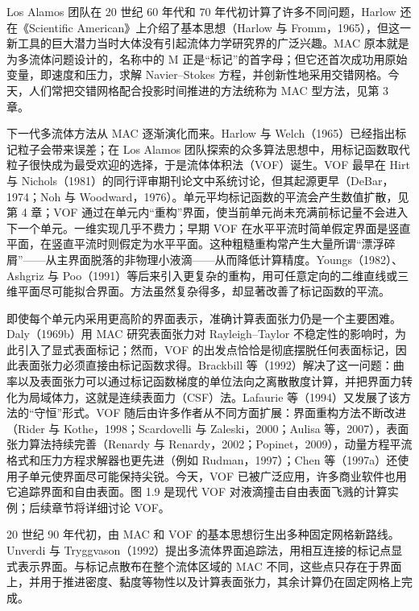 \documentclass[11pt,a4paper,openany,fontset=none]{ctexbook}
\newenvironment{sourceblock}
  {\par\addvspace{0.65\baselineskip}\noindent\begin{minipage}{\linewidth}\centering}
  {\end{minipage}\par\addvspace{0.48\baselineskip}}
\begin{document}
Los Alamos 团队在 20 世纪 60 年代和 70 年代初计算了许多不同问题，Harlow 还在《Scientific American》上介绍了基本思想（Harlow 与 Fromm，1965），但这一新工具的巨大潜力当时大体没有引起流体力学研究界的广泛兴趣。MAC 原本就是为多流体问题设计的，名称中的 M 正是“标记”的首字母；但它还首次成功用原始变量，即速度和压力，求解 Navier--Stokes 方程，并创新性地采用交错网格。今天，人们常把交错网格配合投影时间推进的方法统称为 MAC 型方法，见第 3 章。

下一代多流体方法从 MAC 逐渐演化而来。Harlow 与 Welch（1965）已经指出标记粒子会带来误差；在 Los Alamos 团队探索的众多算法思想中，用标记函数取代粒子很快成为最受欢迎的选择，于是流体体积法（VOF）诞生。VOF 最早在 Hirt 与 Nichols（1981）的同行评审期刊论文中系统讨论，但其起源更早（DeBar，1974；Noh 与 Woodward，1976）。单元平均标记函数的平流会产生数值扩散，见第 4 章；VOF 通过在单元内“重构”界面，使当前单元尚未充满前标记量不会进入下一个单元。一维实现几乎不费力；早期 VOF 在水平平流时简单假定界面是竖直平面，在竖直平流时则假定为水平平面。这种粗糙重构常产生大量所谓“漂浮碎屑”——从主界面脱落的非物理小液滴——从而降低计算精度。Youngs（1982）、Ashgriz 与 Poo（1991）等后来引入更复杂的重构，用可任意定向的二维直线或三维平面尽可能拟合界面。方法虽然复杂得多，却显著改善了标记函数的平流。

即使每个单元内采用更高阶的界面表示，准确计算表面张力仍是一个主要困难。Daly（1969b）用 MAC 研究表面张力对 Rayleigh--Taylor 不稳定性的影响时，为此引入了显式表面标记；然而，VOF 的出发点恰恰是彻底摆脱任何表面标记，因此表面张力必须直接由标记函数求得。Brackbill 等（1992）解决了这一问题：曲率以及表面张力可以通过标记函数梯度的单位法向之离散散度计算，并把界面力转化为局域体力，这就是连续表面力（CSF）法。Lafaurie 等（1994）又发展了该方法的“守恒”形式。VOF 随后由许多作者从不同方面扩展：界面重构方法不断改进（Rider 与 Kothe，1998；Scardovelli 与 Zaleski，2000；Aulisa 等，2007），表面张力算法持续完善（Renardy 与 Renardy，2002；Popinet，2009），动量方程平流格式和压力方程求解器也更先进（例如 Rudman，1997）；Chen 等（1997a）还使用子单元使界面尽可能保持尖锐。今天，VOF 已被广泛应用，许多商业软件也用它追踪界面和自由表面。图 1.9 是现代 VOF 对液滴撞击自由表面飞溅的计算实例；后续章节将详细讨论 VOF。

\begin{sourceblock}
\end{sourceblock}

20 世纪 90 年代初，由 MAC 和 VOF 的基本思想衍生出多种固定网格新路线。Unverdi 与 Tryggvason（1992）提出多流体界面追踪法，用相互连接的标记点显式表示界面。与标记点散布在整个流体区域的 MAC 不同，这些点只存在于界面上，并用于推进密度、黏度等物性以及计算表面张力，其余计算仍在固定网格上完成。
\end{document}
